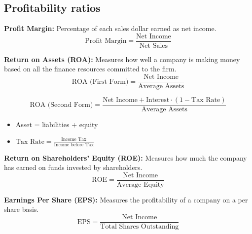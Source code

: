 \subsection{Profitability ratios}
\begin{definition}

    \textbf{Profit Margin:} Percentage of each sales dollar earned as net income.
    \begin{equation}
        \text{Profit Margin} = \frac{\text{Net Income}}{\text{Net Sales}}
    \end{equation}
    \vspace{1em}

    \textbf{Return on Assets (ROA):} Measures how well a company is making money based on all the finance resources committed to the firm.
    \begin{equation}
        \text{ROA (First Form)} = \frac{\text{Net Income}}{\text{Average Assets}}
    \end{equation}

    \begin{equation}
        \text{ROA (Second Form)} = \frac{\text{Net Income} + \text{Interest} \cdot (1 - \text{Tax Rate})}{\text{Average Assets}}
    \end{equation}

    \begin{itemize}
        \item Asset = liabilities + equity
        \item $\text{Tax Rate} = \frac{\text{Income Tax}}{\text{Income before Tax}}$
    \end{itemize}
    \vspace{1em}

    \textbf{Return on Shareholders' Equity (ROE):} Measures how much the company has earned on funds invested by shareholders.
    \begin{equation}
        \text{ROE} = \frac{\text{Net Income}}{\text{Average Equity}}
    \end{equation}
    \vspace{1em}

    \textbf{Earnings Per Share (EPS):} Measures the profitability of a company on a per share basis.
    \begin{equation}
        \text{EPS} = \frac{\text{Net Income}}{\text{Total Shares Outstanding}}
    \end{equation}
\end{definition}

